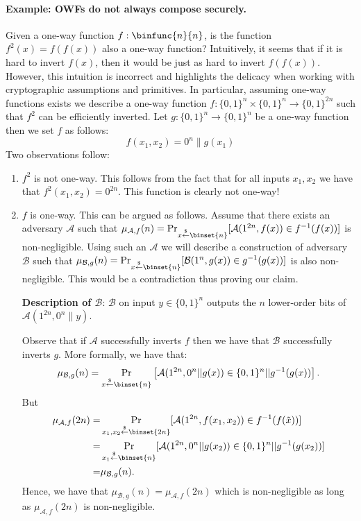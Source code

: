 \documentclass[12pt]{tufte-book}
\begin{document}
\paragraph{Example: OWFs do not always compose securely.}
Given a one-way function $f : \binfunc{n}{n}$, is the function $f^2(x) = f(f(x))$ also a one-way function?  Intuitively, it seems that if it is hard to invert $f(x)$, then it would be just as hard to invert $f(f(x))$. 
However, this intuition is incorrect and highlights the delicacy when working with cryptographic assumptions and primitives. In particular, assuming one-way functions exists we describe a one-way function $f: \{0,1\}^{n}\times \{0,1\}^{n} \rightarrow \{0,1\}^{2n}$ such that $f^2$ can be efficiently inverted.
Let $g: \{0,1\}^n \rightarrow \{0,1\}^n$ be a one-way function then we set $f$ as follows:
$$f(x_1,x_2) = 0^{n}\|g(x_1)$$
Two observations follow:
\begin{enumerate} 
  \item $f^2$ is not one-way. This follows from the fact that for all inputs $x_1, x_2$ we have that $f^2(x_1,x_2) = 0^{2n}$. This function is clearly not one-way!
  \item $f$ is one-way. This can be argued as follows. Assume that there exists an adversary $\mathcal{A}$ such that $\mu_{\mathcal{A},f}(n) = \Pr_{x \stackrel{\$}{\leftarrow} \binset{n}}[ \mathcal{A}(1^{2n}, f(x)) \in f^{-1}(f(x))]$ is non-negligible. Using such an $\mathcal{A}$ we will describe a construction of adversary $\mathcal{B}$ such that $\allowbreak\mu_{\mathcal{B},g}(n) = \Pr_{x \stackrel{\$}{\leftarrow} \binset{n}}[ \mathcal{B}(1^n, g(x)) \in g^{-1}(g(x))]$ is also non-negligible. This would be a contradiction thus proving our claim.

      \textbf{Description of $\mathcal{B}$}: $\mathcal{B}$ on input $y \in\{0,1\}^n$ outputs the $n$ lower-order bits of  $\mathcal{A}(1^{2n}, 0^{n}\|y)$.

      Observe that if $\mathcal{A}$ successfully inverts $f$ then we have that $\mathcal{B}$ successfully inverts $g$. More formally, we have that:
      $$\mu_{\mathcal{B},g}(n) = \Pr_{x \stackrel{\$}{\leftarrow} \binset{n}}\left[ \mathcal{A}(1^{2n}, 0^n || g(x)) \in \{0,1\}^n || g^{-1}(g(x))\right].$$
      But
      \begin{align*}
      \mu_{\mathcal{A},f}(2n) =& \Pr_{x_1, x_2 \stackrel{\$}{\leftarrow} \binset{2n}}[ \mathcal{A}(1^{2n}, f(x_1, x_2)) \in f^{-1}(f(\tilde x))]\\
      = & \Pr_{x_1 \stackrel{\$}{\leftarrow} \binset{n}}[ \mathcal{A}(1^{2n}, 0^n || g(x_2)) \in \{0,1\}^n || g^{-1}(g(x_2))] \\
      = & \mu_{\mathcal{B},g}(n).
      \end{align*}
      Hence, we have that $\mu_{\mathcal{B},g}(n) = \mu_{\mathcal{A},f}(2n)$ which is non-negligible as long as $\mu_{\mathcal{A},f}(2n)$  is non-negligible.
\end{enumerate}
\end{document}
